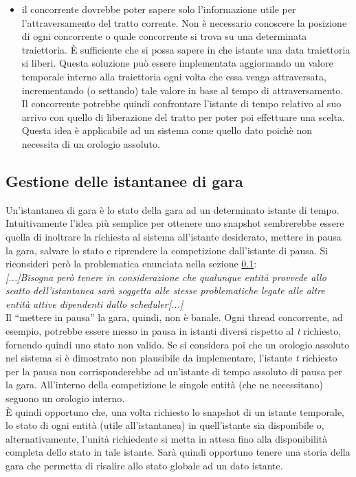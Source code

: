 \begin{description}
\begin{itemize}
\item il concorrente dovrebbe poter sapere solo l'informazione utile per l'attraversamento del tratto corrente. Non è necessario
conoscere la posizione di ogni concorrente o quale concorrente si trova su una determinata traiettoria. \`{E} sufficiente che
si possa sapere in che istante una data traiettoria si liberi. Questa soluzione può essere implementata aggiornando un valore
temporale interno alla traiettoria ogni volta che essa venga attraversata, incrementando (o settando) tale valore in base al 
tempo di attraversamento. Il concorrente potrebbe quindi confrontare l'istante di tempo relativo
al suo arrivo con quello di liberazione del tratto per poter poi effettuare una scelta.\\
Questa idea è applicabile ad un sistema come quello dato poichè non necessita di un orologio assoluto.
\end{itemize}
\end{description}
\subsection{Gestione delle istantanee di gara}
\label{enunciazione_istantanee}
Un'istantanea di gara è lo stato della gara ad un determinato istante di tempo. Intuitivamente l'idea più semplice per ottenere
uno snapshot sembrerebbe essere quella di inoltrare la richiesta al sistema all'istante desiderato, mettere in pausa la gara, 
salvare lo stato e riprendere la competizione dall'istante di pausa. Si riconsideri però la problematica enunciata nella
sezione \ref{enunciazione_istantanee}:\\
\emph{[...]Bisogna però tenere in considerazione che qualunque entità provvede allo scatto
dell'istantanea sarà soggetta alle stesse problematiche legate alle altre entità attive dipendenti dallo scheduler[...]}\\
Il ``mettere in pausa'' la gara, quindi, non è banale. Ogni thread concorrente, ad esempio, potrebbe essere messo in pausa
in istanti diversi rispetto al \emph{t} richiesto, fornendo quindi uno stato non valido. Se si considera poi che un orologio
assoluto nel sistema si è dimostrato non plausibile da implementare, l'istante \emph{t} richiesto per la pausa non corrisponderebbe ad un'istante
di tempo assoluto di pausa per la gara. All'interno della competizione le singole entità (che ne necessitano) seguono un orologio interno.\\
\`{E} quindi opportuno che, una volta richiesto lo snapshot di un istante temporale, lo stato di ogni entità (utile all'istantanea) in 
quell'istante sia disponibile o, alternativamente, l'unità richiedente si metta in attesa fino alla disponibilità completa dello stato
in tale istante. Sarà quindi opportuno tenere una storia della gara che permetta di risalire allo stato globale ad un dato istante.

